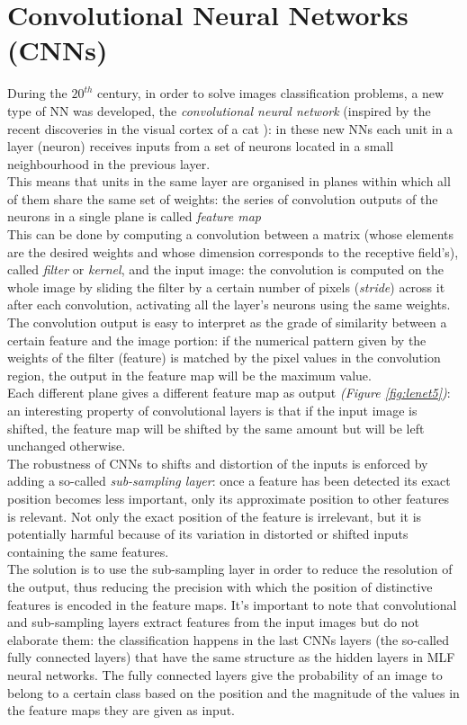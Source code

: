 \documentclass[../main.tex]{subfiles}
\begin{document}
\vspace{5mm}
\section{Convolutional Neural Networks (CNNs)}
During the $20^{th}$ century, in order to solve images classification problems, a new type of NN was developed, the \textit{convolutional neural network} (inspired by the recent discoveries in the visual cortex of a cat \cite{Hubel1962}): in these new NNs each unit in a layer (neuron) receives inputs from a set of neurons located in a small neighbourhood in the previous layer.  \\
This means that units in the same layer are organised in planes within which all of them share the same set of weights: the series of convolution outputs of the neurons in a single plane is called \textit{feature map} \cite{LeCun1998} \\
This can be done by computing a convolution between a matrix (whose elements are the desired weights and whose dimension corresponds to the receptive field's), called \textit{filter} or \textit{kernel}, and the input image: the convolution is computed on the whole image by sliding the filter by a certain number of pixels (\textit{stride}) across it after each convolution, activating all the layer's neurons using the same weights. \\ 
The convolution output is easy to interpret as the grade of similarity between a certain feature and the image portion: if the numerical pattern given by the weights of the filter (feature) is matched by the pixel values in the convolution region, the output in the feature map will be the maximum value. \\
Each different plane gives a different feature map as output \textit{(Figure \ref{fig:lenet5})}: an interesting property of convolutional layers is that if the input image is shifted, the feature map will be shifted by the same amount but will be left unchanged otherwise.  \\
The robustness of CNNs to shifts and distortion of the inputs is enforced by adding a so-called \textit{sub-sampling layer}: once a feature has been detected its exact position becomes less important, only its approximate position to other features is relevant. Not only the exact position of the feature is irrelevant, but it is potentially harmful because of its variation in distorted or shifted inputs containing the same features. \\ The solution is to use the sub-sampling layer in order to reduce the resolution of the output, thus reducing the precision with which the position of distinctive features is encoded in the feature maps. \cite{LeCun1998}
It's important to note that convolutional and sub-sampling layers extract features from the input images but do not elaborate them: the classification happens in the last CNNs layers (the so-called fully connected layers) that have the same structure as the hidden layers in MLF neural networks. 
The fully connected layers give the probability of an image to belong to a certain class based on the position and the magnitude of the values in the feature maps they are given as input.
\end{document}
